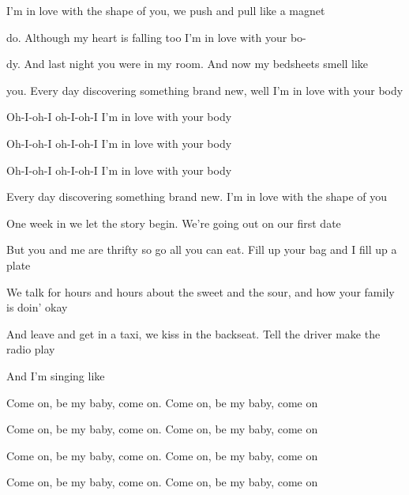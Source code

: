 \begin{song}
\begin{chorusboxwide}{\PrechorusAndChorus}
 I'm in love with the shape of you, we push and pull like a magnet \par
{}do. Although my heart is falling too I'm in love with your bo- \par
{}dy. And last night you were in my room. And now my bedsheets smell like \par
{}you. Every day discovering something brand new, well I'm in love with your body \par
{}Oh-I-oh-I oh-I-oh-I  I'm in love with your body \par
{}Oh-I-oh-I oh-I-oh-I  I'm in love with your body \par
{}Oh-I-oh-I oh-I-oh-I  I'm in love with your body \par
{} Every day discovering something brand new. I'm in love with the shape of you \par
\end{chorusboxwide}

\bigskip

One week in we let the story begin. We're going out on our first date \par
But you and me are thrifty so go all you can eat. Fill up your bag and I fill up a plate \par
We talk for hours and hours about the sweet and the sour, and how your family is doin' okay \par
And leave and get in a taxi, we kiss in the backseat. Tell the driver make the radio play \par
And I'm singing like \par

\bigskip

\PrechorusAndChorus

\bigskip

 \par
Come on, be my baby, come on. Come on, be my baby, come on \par
Come on, be my baby, come on. Come on, be my baby, come on \par
{} Come on, be my baby, come on.  Come on, be my baby, come on \par
{} Come on, be my baby, come on.  Come on, be my baby, come on \par


\end{song}
